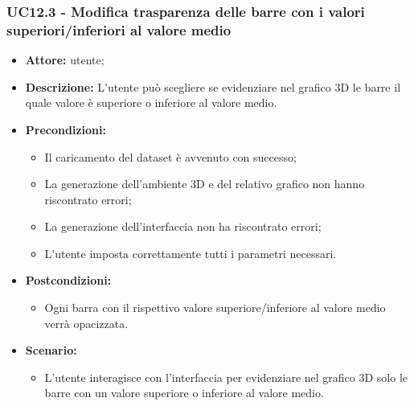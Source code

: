 \subsubsection{UC12.3 - Modifica trasparenza delle barre con i valori superiori/inferiori al valore medio}
\begin{itemize}    
    \item \textbf{Attore:} utente;
    \item \textbf{Descrizione:} L'utente può scegliere se evidenziare nel grafico 3D le barre il quale valore è superiore o inferiore al valore medio.
    \item \textbf{Precondizioni:}    
        \begin{itemize}
            \item Il caricamento del dataset è avvenuto con successo;
            \item La generazione dell'ambiente 3D e del relativo grafico non hanno riscontrato errori;
            \item La generazione dell'interfaccia non ha riscontrato errori;
            \item L'utente imposta correttamente tutti i parametri necessari.
        \end{itemize}    
    \item \textbf{Postcondizioni:}
        \begin{itemize}
            \item Ogni barra con il rispettivo valore superiore/inferiore al valore medio verrà opacizzata.
        \end{itemize}    
    \item \textbf{Scenario:} 
        \begin{itemize}
            \item L'utente interagisce con l'interfaccia per evidenziare nel grafico 3D solo le barre con un valore superiore o inferiore al valore medio.
        \end{itemize}
\end{itemize}

